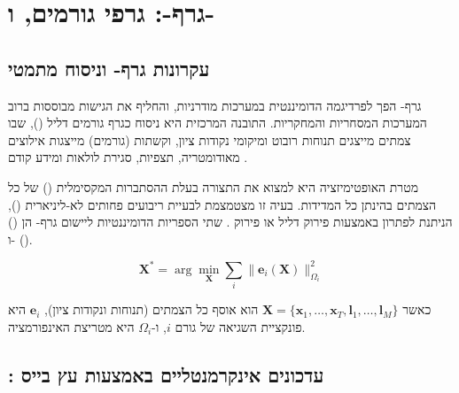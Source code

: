 

\section{גרף-: גרפי גורמים,  ו-}
\label{sec:fusion}

\subsection{עקרונות גרף- וניסוח מתמטי}
\label{subsec:graphslam_principles}

גרף- הפך לפרדיגמה הדומיננטית במערכות  מודרניות,
והחליף את הגישות מבוססות  ברוב המערכות המסחריות והמחקריות.
התובנה המרכזית היא ניסוח  כגרף גורמים דליל
(), שבו צמתים מייצגים תנוחות רובוט
ומיקומי נקודות ציון, וקשתות (גורמים) מייצגות אילוצים
מאודומטריה, תצפיות, סגירת לולאות ומידע קודם \cite{Thrun2005ProbRobotics}.

מטרת האופטימיזציה היא למצוא את התצורה בעלת ההסתברות המקסימלית
() של כל הצמתים בהינתן כל המדידות. בעיה זו מצטמצמת
לבעיית ריבועים פחותים לא-ליניארית (),
הניתנת לפתרון באמצעות פירוק  דליל או פירוק .
שתי הספריות הדומיננטיות ליישום גרף- הן 
() ו-
().

\begin{equation}
    \mathbf{X}^* = \arg\min_{\mathbf{X}} \sum_{i} \| \mathbf{e}_{i}(\mathbf{X}) \|_{\Omega_i}^2
    \label{eq:graph_slam_objective}
\end{equation}

כאשר $\mathbf{X} = \{\mathbf{x}_1, \ldots, \mathbf{x}_T, \mathbf{l}_1, \ldots, \mathbf{l}_M\}$
הוא אוסף כל הצמתים (תנוחות ונקודות ציון), $\mathbf{e}_i$ היא פונקציית
השגיאה של גורם $i$, ו-$\Omega_i$ היא מטריצת האינפורמציה.

\subsection{: עדכונים אינקרמנטליים באמצעות עץ בייס}
\label{subsec:isam2}

